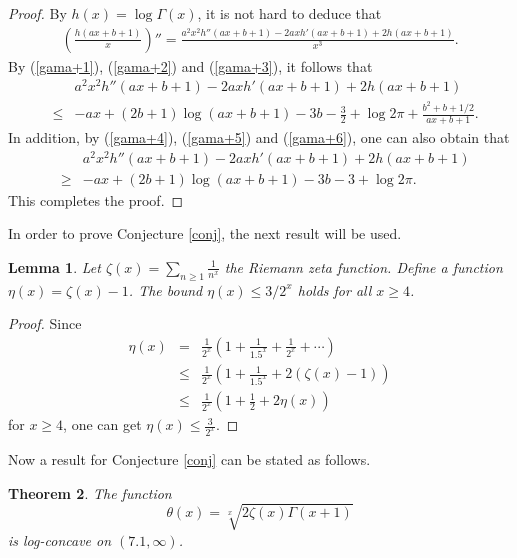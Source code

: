 \documentclass[12pt,reqno]{article}
\newtheorem{thm}{Theorem}[section]
\newtheorem{lem}[thm]{Lemma}
\theoremstyle{definition}
\numberwithin{equation}{section}
\begin{document}
\begin{proof}
By $h(x)=\log{\Gamma(x)}$, it is not hard to deduce that
\begin{eqnarray*}
\left(\frac{h(ax+b+1)}{x}\right)''=\frac{a^2x^2h''(ax+b+1)-2axh'(ax+b+1)+2h(ax+b+1)}{x^3}.
\end{eqnarray*}
By (\ref{gama+1}), (\ref{gama+2}) and (\ref{gama+3}), it follows
that
\begin{eqnarray*}
&&a^2x^2h''(ax+b+1)-2axh'(ax+b+1)+2h(ax+b+1)\\
&\leq&-ax+(2b+1)\log{(ax+b+1)}-3b-\frac{3}{2}+\log{2\pi}+\frac{b^2+b+1/2}{ax+b+1}.
\end{eqnarray*}
In addition, by (\ref{gama+4}), (\ref{gama+5}) and (\ref{gama+6}),
one can also obtain that
\begin{eqnarray*}
&&a^2x^2h''(ax+b+1)-2axh'(ax+b+1)+2h(ax+b+1)\\
&\geq&-ax+(2b+1)\log{(ax+b+1)}-3b-3+\log{2\pi}.
\end{eqnarray*}
This completes the proof.
\end{proof}
In order to prove Conjecture \ref{conj}, the next result will be
used.
\begin{lem}\label{bound+zeta}
Let $\zeta(x)=\sum_{n\geq1}\frac{1}{n^x}$ the Riemann zeta function.
Define a function $\eta(x)=\zeta(x)-1$. The bound $\eta(x)\leq
3/2^x$ holds for all $x\geq 4$.
\end{lem}
\begin{proof}
Since
\begin{eqnarray*}
\eta(x)&=&\frac{1}{2^x}\left(1+\frac{1}{1.5^x}+\frac{1}{2^x}+\cdots\right)\\
&\leq&\frac{1}{2^x}\left(1+\frac{1}{1.5^x}+2\left(\zeta(x)-1\right)\right)\\
&\leq&\frac{1}{2^x}\left(1+\frac{1}{2}+2\eta(x)\right)
\end{eqnarray*}
for $x\geq4$, one can get $\eta(x)\leq\frac{3}{2^x}.$
\end{proof}
Now a result for Conjecture \ref{conj} can be stated as follows.
\begin{thm}\label{thm+con}
The function
$$\theta(x)=\sqrt[x]{2 \zeta(x)\Gamma(x+1)}$$
is log-concave on $(7.1,\infty)$.
\end{thm}
\end{document}
